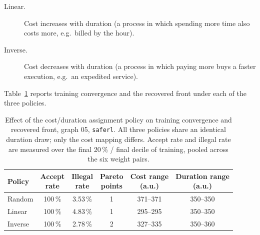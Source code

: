 \begin{description}
    \item[Linear.] Cost increases with duration (a process in which
    spending more time also costs more, e.g.\ billed by the hour).
    \item[Inverse.] Cost decreases with duration (a process in which
    paying more buys a faster execution, e.g.\ an expedited service).
\end{description}

Table~\ref{tab:external_policy} reports training convergence and the
recovered front under each of the three policies.

\begin{table}[H]
\centering
\caption{Effect of the cost/duration assignment policy on training
convergence and recovered front, graph 05, \texttt{saferl}. All three
policies share an identical duration draw; only the cost mapping
differs. Accept rate and illegal rate are measured over the final
20\,\% / final decile of training, pooled across the six weight pairs.}
\label{tab:external_policy}
{\renewcommand{\arraystretch}{1.5}
\setlength{\tabcolsep}{6pt}
\begin{tabular}{lccccc}
\toprule
\textbf{Policy} & \shortstack{\textbf{Accept}\\\textbf{rate}} & \shortstack{\textbf{Illegal}\\\textbf{rate}} & \shortstack{\textbf{Pareto}\\\textbf{points}} & \shortstack{\textbf{Cost range}\\\textbf{(a.u.)}} & \shortstack{\textbf{Duration range}\\\textbf{(a.u.)}} \\
\midrule
Random  & 100\,\% & 3.53\,\% & 1 & 371--371 & 350--350 \\
Linear  & 100\,\% & 4.83\,\% & 1 & 295--295 & 350--350 \\
Inverse & 100\,\% & 2.78\,\% & 2 & 327--335 & 350--360 \\
\bottomrule
\end{tabular}}
\end{table}

